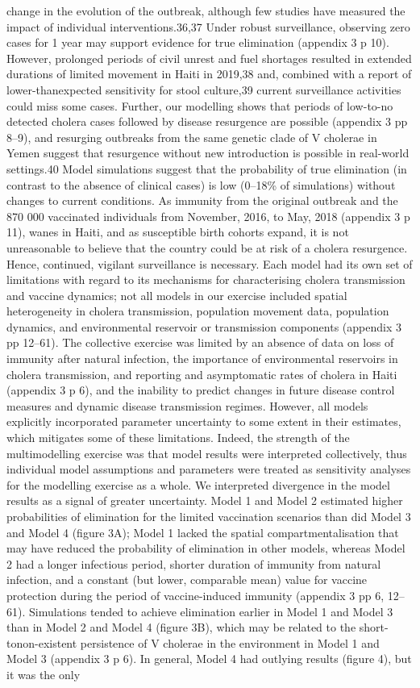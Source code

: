 change in the evolution of the outbreak, although few studies have measured the impact of individual interventions.36,37 Under robust surveillance, observing zero cases for 1 year may support evidence for true elimination (appendix 3 p 10). However, prolonged periods of civil unrest and fuel shortages resulted in extended durations of limited movement in Haiti in 2019,38 and, combined with a report of lower-thanexpected sensitivity for stool culture,39 current surveillance activities could miss some cases. Further, our modelling shows that periods of low-to-no detected cholera cases followed by disease resurgence are possible (appendix 3 pp 8–9), and resurging outbreaks from the same genetic clade of V cholerae in Yemen suggest that resurgence without new introduction is possible in real-world settings.40 Model simulations suggest that the probability of true elimination (in contrast to the absence of clinical cases) is low (0–18\% of simulations) without changes to current conditions. As immunity from the original outbreak and the 870 000 vaccinated individuals from November, 2016, to May, 2018 (appendix 3 p 11), wanes in Haiti, and as susceptible birth cohorts expand, it is not unreasonable to believe that the country could be at risk of a cholera resurgence. Hence, continued, vigilant surveillance is necessary. Each model had its own set of limitations with regard to its mechanisms for characterising cholera transmission and vaccine dynamics; not all models in our exercise included spatial heterogeneity in cholera transmission, population movement data, population dynamics, and environmental reservoir or transmission components (appendix 3 pp 12–61). The collective exercise was limited by an absence of data on loss of immunity after natural infection, the importance of environmental reservoirs in cholera transmission, and reporting and asymptomatic rates of cholera in Haiti (appendix 3 p 6), and the inability to predict changes in future disease control measures and dynamic disease transmission regimes. However, all models explicitly incorporated parameter uncertainty to some extent in their estimates, which mitigates some of these limitations. Indeed, the strength of the multimodelling exercise was that model results were interpreted collectively, thus individual model assumptions and parameters were treated as sensitivity analyses for the modelling exercise as a whole. We interpreted divergence in the model results as a signal of greater uncertainty. Model 1 and Model 2 estimated higher probabilities of elimination for the limited vaccination scenarios than did Model 3 and Model 4 (figure 3A); Model 1 lacked the spatial compartmentalisation that may have reduced the probability of elimination in other models, whereas Model 2 had a longer infectious period, shorter duration of immunity from natural infection, and a constant (but lower, comparable mean) value for vaccine protection during the period of vaccine-induced immunity (appendix 3 pp 6, 12–61). Simulations tended to achieve elimination earlier in Model 1 and Model 3 than in Model 2 and Model 4 (figure 3B), which may be related to the short-tonon-existent persistence of V cholerae in the environment in Model 1 and Model 3 (appendix 3 p 6). In general, Model 4 had outlying results (figure 4), but it was the only 
